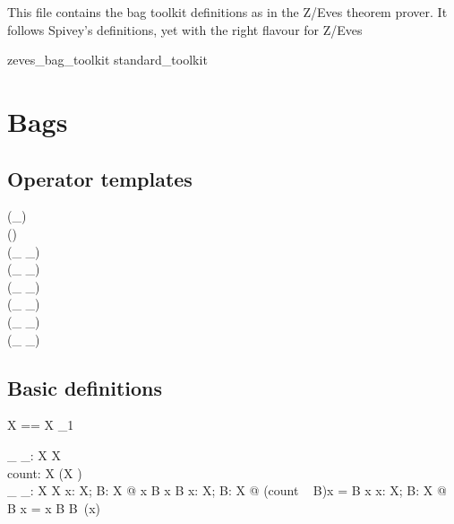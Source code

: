 \documentclass[draft,a4paper,10pt,wd]{article}
\begin{document}
This file contains the bag toolkit definitions as in the Z/Eves
theorem prover. It follows Spivey's definitions, yet with the
right flavour for Z/Eves

\begin{zsection}
\SECTION zeves\_bag\_toolkit \parents standard\_toolkit
\end{zsection}

\section{Bags }\label{def-bag}

\subsection*{Operator templates}

\begin{zed}
    \generic (\bag \_) \\
    \function (\lbag \listarg \rbag) \\
     \leftassoc (\_ \bcount \_) \\
     \leftassoc (\_ \otimes \_) \\
    \relation (\_ \inbag \_) \\
    \relation (\_ \subbageq \_) \\
     \leftassoc (\_ \uplus \_) \\
     \leftassoc (\_ \uminus \_)
\end{zed}

\subsection*{Basic definitions}

\begin{zed}
  \bag X == X \pfun \nat_1
\end{zed}

\begin{gendef}[X]
  \_ \inbag \_: X \rel \bag X \\
  count: \bag X \fun (X \fun \nat) \\
  \_ \bcount \_: \bag X \cross X \fun \nat
\where
  \forall x: X; B: \bag X @ x \inbag B \iff x \in \dom B
\also
  \forall x: X; B: \bag X @ (count ~ B)x = B \bcount x
\also
  \forall x: X; B: \bag X @ B \bcount x =
    \IF x \inbag B \THEN B~(x) 
\end{gendef}
\end{document}
